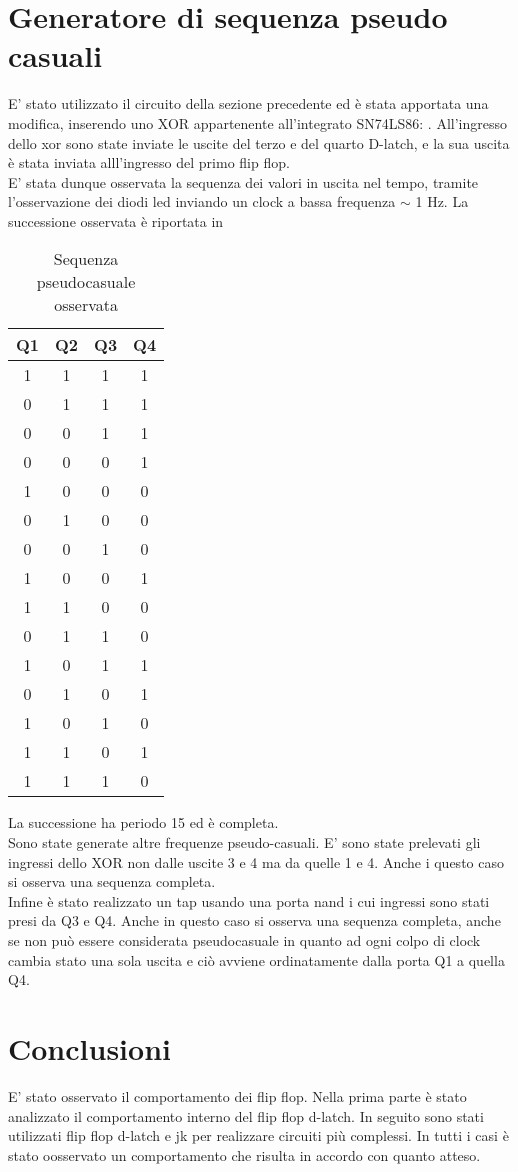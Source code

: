 \section{Generatore di sequenza pseudo casuali}
E' stato utilizzato il circuito della sezione precedente ed è stata apportata una modifica, inserendo uno XOR appartenente all'integrato SN74LS86: . All'ingresso dello xor sono state inviate le uscite del terzo e del quarto D-latch, e la sua uscita è stata inviata alll'ingresso del primo flip flop.\\
E' stata dunque osservata la sequenza dei valori in uscita nel tempo, tramite l'osservazione dei diodi led inviando un clock a bassa frequenza $\sim$ 1 Hz. La successione osservata è riportata in 

\begin{table}[h]
	\centering
	\begin{tabular}{cccc}
		Q1 & Q2 & Q3 & Q4 \\
		\midrule
		 1 & 1 & 1 & 1\\
		 0 & 1 & 1 & 1\\
		 0 & 0 & 1 & 1\\
		 0 & 0 & 0 & 1\\
		 1 & 0 & 0 & 0\\
	 	 0 & 1 & 0 & 0\\
	 	 0 & 0 & 1 & 0\\
	 	 1 & 0 & 0 & 1\\
	 	 1 & 1 & 0 & 0\\
	 	 0 & 1 & 1 & 0\\
	 	 1 & 0 & 1 & 1\\
	 	 0 & 1 & 0 & 1\\
	 	 1 & 0 & 1 & 0\\
	 	 1 & 1 & 0 & 1\\
	 	 1 & 1 & 1 & 0\\
		 
 	\end{tabular}
	\caption{ Sequenza pseudocasuale osservata }
	\label{t:sequenza}
\end{table} 
La successione ha periodo 15 ed è completa.\\
Sono state generate altre frequenze pseudo-casuali. E' sono state prelevati gli ingressi dello XOR non dalle uscite 3 e 4 ma da quelle 1 e 4. Anche i questo caso si osserva una sequenza completa.\\
Infine è stato realizzato un tap usando una porta nand i cui ingressi sono stati presi da Q3 e Q4. Anche in questo caso si osserva una sequenza completa, anche se non può essere considerata pseudocasuale in quanto ad ogni colpo di clock cambia stato una sola uscita e ciò avviene ordinatamente dalla porta Q1 a quella Q4.

\section{Conclusioni}
E' stato osservato il comportamento dei flip flop. Nella prima parte è stato analizzato il comportamento interno del flip flop d-latch. In seguito sono stati utilizzati flip flop d-latch e jk per realizzare circuiti più complessi. In tutti i casi è stato oosservato un comportamento che risulta in accordo con quanto atteso.  